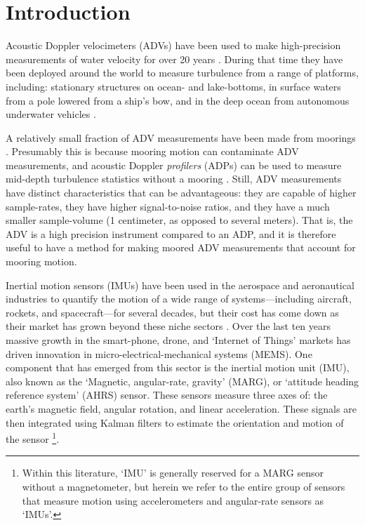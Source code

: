 
\section{Introduction}

Acoustic Doppler velocimeters (ADVs) have been used to make high-precision measurements of water velocity for over 20 years \cite[]{Kraus++1994, Lohrmann++1995}.  During that time they have been deployed around the world to measure turbulence from a range of platforms, including: stationary structures on ocean- and lake-bottoms, in surface waters from a pole lowered from a ship's bow, and in the deep ocean from autonomous underwater vehicles \cite[e.g.][]{Voulgaris+Trowbridge1998, Zhang++2001, Kim++2000, Goodman++2006, Lorke2007, Geyer++2008, Cartwright++2009}. 


A relatively small fraction of ADV measurements have been made from moorings \cite[e.g.][]{Fer+Paskyabi2014}. Presumably this is because mooring motion can contaminate ADV measurements, and acoustic Doppler {\it profilers} (ADPs) can be used to measure mid-depth turbulence statistics without a mooring \cite[e.g.][]{Stacey++1999a, Rippeth++2002, Wiles++2006}. Still, ADV measurements have distinct characteristics that can be advantageous: they are capable of higher sample-rates, they have higher signal-to-noise ratios, and they have a much smaller sample-volume (1 centimeter, as opposed to several meters). That is, the ADV is a high precision instrument compared to an ADP, and it is therefore useful to have a method for making moored ADV measurements that account for mooring motion.

Inertial motion sensors (IMUs) have been used in the aerospace and aeronautical industries to quantify the motion of a wide range of systems---including aircraft, rockets, and spacecraft---for several decades, but their cost has come down as their market has grown beyond these niche sectors \cite[]{Bevly2004}. Over the last ten years massive growth in the smart-phone, drone, and `Internet of Things' markets has driven innovation in micro-electrical-mechanical systems (MEMS). One component that has emerged from this sector is the inertial motion unit (IMU), also known as the `Magnetic, angular-rate, gravity' (MARG), or `attitude heading reference system' (AHRS) sensor. These sensors measure three axes of: the earth's magnetic field, angular rotation, and linear acceleration. These signals are then integrated using Kalman filters to estimate the orientation and motion of the sensor \cite[]{Barshan+Whyte1995, Marins++2001, Bachmann++2003}\footnote{Within this literature, `IMU' is generally reserved for a MARG sensor without a magnetometer, but herein we refer to the entire group of sensors that measure motion using accelerometers and angular-rate sensors as `IMUs'.}.

